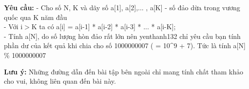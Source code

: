 \textbf{Yêu cầu: }
- Cho số N, K và dãy số a[1], a[2],... , a[K] - số đảo dừa trong vương quốc qua K năm đầu
\\- Với i$>$K ta có a[i] = a[i-1] * a[i-2] * a[i-3] * ... * a[i-K];
\\- Tính a[N], do số lượng hòn đảo rất lớn nên yenthanh132 chỉ yêu cầu bạn tính phần dư của kết quả khi chia cho số 1000000007 ( = 10^9 + 7). Tức là tính a[N] \% 1000000007

\textbf{Lưu ý: } Những đường dẫn đến bài tập bên ngoài chỉ mang tính chất tham khảo cho vui, không liên quan đến bài này.

 